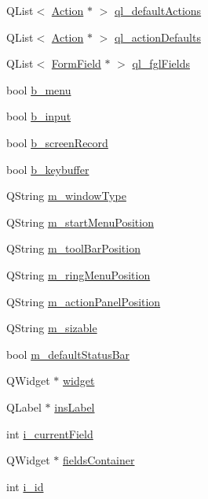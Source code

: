 \begin{DoxyCompactItemize}
\item 
QList$<$ \hyperlink{classAction}{Action} $\ast$ $>$ \hyperlink{classFglForm_acc7f6b6c7b13cf1e6e39bfdeba18ddc1}{ql\_\-defaultActions}
\item 
QList$<$ \hyperlink{classAction}{Action} $\ast$ $>$ \hyperlink{classFglForm_a6b78dae39bcab3791a9acc99a3b8248d}{ql\_\-actionDefaults}
\item 
QList$<$ \hyperlink{classFormField}{FormField} $\ast$ $>$ \hyperlink{classFglForm_a1d775e481b65ae50b2a557fa9ae975c5}{ql\_\-fglFields}
\item 
bool \hyperlink{classFglForm_ac1f8bea18516701b1192825f83e962d7}{b\_\-menu}
\item 
bool \hyperlink{classFglForm_a348ba4d61a2c9e18513ac88c919015c0}{b\_\-input}
\item 
bool \hyperlink{classFglForm_a656061ca98f40226c99fa61b12ced56c}{b\_\-screenRecord}
\item 
bool \hyperlink{classFglForm_ae5096059ba81229c8e0070e85286420f}{b\_\-keybuffer}
\item 
QString \hyperlink{classFglForm_aff3b675ee7063af63839e029f66b4075}{m\_\-windowType}
\item 
QString \hyperlink{classFglForm_a94e20a9c06c349d6e7c5ec47c03de4a6}{m\_\-startMenuPosition}
\item 
QString \hyperlink{classFglForm_a0008c6a1c3362095ebd5ab0601910003}{m\_\-toolBarPosition}
\item 
QString \hyperlink{classFglForm_a25371a3df6cb3e1dc66e141bb2a9dff1}{m\_\-ringMenuPosition}
\item 
QString \hyperlink{classFglForm_af3882d981d23db8e6dca26a44ac23051}{m\_\-actionPanelPosition}
\item 
QString \hyperlink{classFglForm_a7861c07caeb306c5ae9f2012ce73bff7}{m\_\-sizable}
\item 
bool \hyperlink{classFglForm_a2e877386e4ba441d929c0c35d48620cb}{m\_\-defaultStatusBar}
\item 
QWidget $\ast$ \hyperlink{classFglForm_a15cd139d56b40da6de43a6bb4d438c0d}{widget}
\item 
QLabel $\ast$ \hyperlink{classFglForm_a72467aa7c8750f7075b7ba7fc67a29bb}{insLabel}
\item 
int \hyperlink{classFglForm_ae7e903902c63ce3179656df4b684038f}{i\_\-currentField}
\item 
QWidget $\ast$ \hyperlink{classFglForm_a67c8174c2d61e69e76c3206766fe3ac9}{fieldsContainer}
\item 
int \hyperlink{classFglForm_a6142cd4363f16562e52631f1987b46c3}{i\_\-id}

\end{DoxyCompactItemize}
